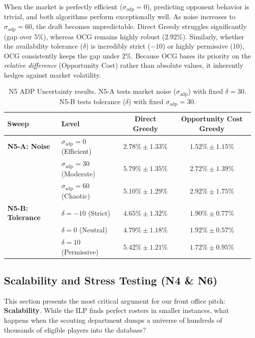 \documentclass[11pt,a4paper]{article}
\begin{document}
When the market is perfectly efficient ($\sigma_{\text{adp}}=0$), predicting opponent behavior is trivial, and both algorithms perform exceptionally well. As noise increases to $\sigma_{\text{adp}}=60$, the draft becomes unpredictable. Direct Greedy struggles significantly (gap over $5\%$), whereas OCG remains highly robust ($2.92\%$). Similarly, whether the availability tolerance ($\delta$) is incredibly strict ($-10$) or highly permissive ($10$), OCG consistently keeps the gap under $2\%$. Because OCG bases its priority on the \textit{relative difference} (Opportunity Cost) rather than absolute values, it inherently hedges against market volatility.

\begin{table}[H]
\centering
\caption{N5 ADP Uncertainty results. N5-A tests market noise ($\sigma_{\text{adp}}$) with fixed $\delta=30$. N5-B tests tolerance ($\delta$) with fixed $\sigma_{\text{adp}}=30$.}
\label{tab:n5}
\begin{tabular}{llcc}
\toprule
Sweep & Level & Direct Greedy & Opportunity Cost Greedy \\
\midrule
\textbf{N5-A: Noise} & $\sigma_{\text{adp}}=0$ (Efficient) & $2.78\% \pm 1.33\%$ & $1.52\% \pm 1.15\%$ \\
 & $\sigma_{\text{adp}}=30$ (Moderate) & $5.79\% \pm 1.35\%$ & $2.72\% \pm 1.39\%$ \\
 & $\sigma_{\text{adp}}=60$ (Chaotic) & $5.10\% \pm 1.29\%$ & $\mathbf{2.92\% \pm 1.75\%}$ \\
\midrule
\textbf{N5-B: Tolerance} & $\delta=-10$ (Strict) & $4.65\% \pm 1.32\%$ & $\mathbf{1.90\% \pm 0.77\%}$ \\
 & $\delta=0$ (Neutral) & $4.79\% \pm 1.18\%$ & $1.92\% \pm 0.57\%$ \\
 & $\delta=10$ (Permissive) & $5.42\% \pm 1.21\%$ & $1.72\% \pm 0.95\%$ \\
\bottomrule
\end{tabular}
\end{table}

\subsection{Scalability and Stress Testing (N4 \& N6)}

This section presents the most critical argument for our front office pitch: \textbf{Scalability}. While the ILP finds perfect rosters in smaller instances, what happens when the scouting department dumps a universe of hundreds of thousands of eligible players into the database?
\end{document}
